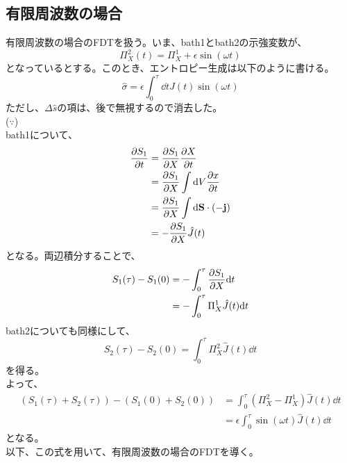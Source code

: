 \documentclass[a4paper,11pt]{jsarticle}
\begin{document}
\subsection{有限周波数の場合}
有限周波数の場合のFDTを扱う。いま、bath1とbath2の示強変数が、
\begin{equation}
    \Pi_X ^2 (t) = \Pi_X ^1 + \epsilon \sin(\omega t)
\end{equation}
となっているとする。このとき、エントロピー生成は以下のように書ける。
\begin{equation}
    \hat{\sigma} = \epsilon \int_{0}^{\tau} \dd t \hat{J}(t) \sin(\omega t)
\end{equation}
ただし、$\Delta \hat{s}$の項は、後で無視するので消去した。\\
($\because$)\\
bath1について、
\begin{align}
    \pdv{S_1}{t} &= \pdv{S_1}{X} \pdv{X}{t}\\
    &= \pdv{S_1}{X} \int \dd V \pdv{x}{t}\\
    &= \pdv{S_1}{X} \int \dd \vb{S} \cdot (\vb{-j})\\
    &= -\pdv{S_1}{X}  \hat{J}(t)\\
\end{align}
となる。両辺積分することで、
\begin{align}
    S_1(\tau) - S_1(0) &= -\int_{0}^{\tau}  \pdv{S_1}{X} (-\hat{J}(t))\dd t\\
    &= -\int_{0}^{\tau}  \Pi_X ^1 \hat{J}(t) \dd t
\end{align}
bath2についても同様にして、
\begin{equation}
    S_2(\tau) - S_2(0) = \int_{0}^{\tau}  \Pi_X ^2 \hat{J}(t) \dd t
\end{equation}
を得る。\\
よって、
\begin{align}
    (S_1(\tau) + S_2(\tau)) - (S_1(0) + S_2(0)) &= \int_{0}^{\tau}  (\Pi_X ^2 - \Pi_X ^1) \hat{J}(t) \dd t\\
    &= \epsilon \int_{0}^{\tau}  \sin(\omega t) \hat{J}(t) \dd t
\end{align}
となる。\hfill \qedsymbol
\\
以下、この式を用いて、有限周波数の場合のFDTを導く。\\
\end{document}
